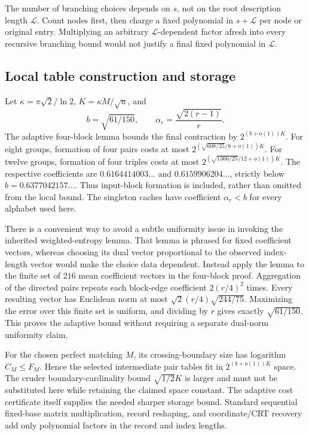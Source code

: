 The number of branching choices depends on $s$, not on the root description
length $\mathcal L$. Count nodes first, then charge a fixed polynomial in
$s+\mathcal L$ per node or original entry. Multiplying an arbitrary
$\mathcal L$-dependent factor afresh into every recursive branching bound
would not justify a final fixed polynomial in $\mathcal L$.

\subsection{Local table construction and storage}

Let $\kappa=\pi\sqrt2/\ln2$, $K=\kappa M/\sqrt u$, and
\[
 b=\sqrt{61/150},\qquad
 \alpha_r=\frac{\sqrt{2(r-1)}}r.
\]
The adaptive four-block lemma bounds the final contraction by
$2^{(b+o(1))K}$. For eight groups, formation of four pairs costs at most
$2^{(\sqrt{608/25}/8+o(1))K}$. For twelve groups, formation of four
triples costs at most $2^{(\sqrt{1366/25}/12+o(1))K}$.
The respective coefficients are $0.6164414003\ldots$ and
$0.6159906204\ldots$, strictly below $b=0.6377042157\ldots$.
Thus input-block formation is included, rather than omitted from the
local bound. The singleton caches have coefficient $\alpha_r<b$ for
every alphabet used here.

There is a convenient way to avoid a subtle uniformity issue in invoking
the inherited weighted-entropy lemma. That lemma is phrased for fixed
coefficient vectors, whereas choosing its dual vector proportional to the
observed index-length vector would make the choice data dependent. Instead
apply the lemma to the finite set of $216$ mean coefficient vectors in the
four-block proof. Aggregation of the directed pairs repeats each block-edge
coefficient $2(r/4)^2$ times. Every resulting vector has Euclidean norm at
most $\sqrt2(r/4)\sqrt{244/75}$. Maximizing the error over this finite set
is uniform, and dividing by $r$ gives exactly $\sqrt{61/150}$. This proves
the adaptive bound without requiring a separate dual-norm uniformity claim.

For the chosen perfect matching $M$, its crossing-boundary size has
logarithm $C_M\le F_M$. Hence the selected intermediate pair tables fit
in $2^{(b+o(1))K}$ space. The cruder boundary-cardinality bound
$\sqrt{1/2}K$ is larger and must not be substituted here while retaining
the claimed space constant. The adaptive cost certificate itself supplies
the needed sharper storage bound. Standard sequential fixed-base matrix
multiplication, record reshaping, and coordinate/CRT recovery add only
polynomial factors in the record and index lengths.

